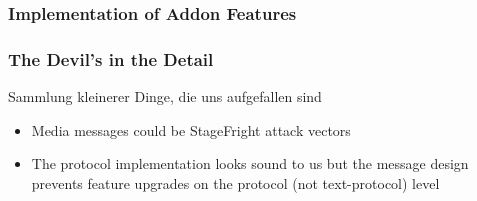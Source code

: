 \documentclass[
	aspectratio=169,
	xetex,
]{beamer}
\newcounter{i}
\begin{document}
\begin{frame}[t]
	\frametitle{Implementation of Addon Features}

		
\end{frame}



\begin{frame}
	\frametitle{The Devil's in the Detail}
	Sammlung kleinerer Dinge, die uns aufgefallen sind
	\begin{itemize}
		\item Media messages could be StageFright attack vectors
		\item The protocol implementation looks sound to us but the message design prevents feature upgrades on the protocol (not text-protocol) level

	\end{itemize}
\end{frame}
\end{document}
